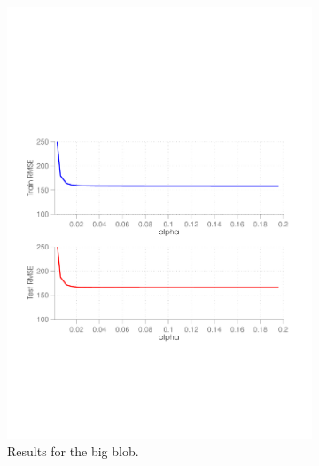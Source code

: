 \begin{figure}[ht]
  \centering
  \begin{subfigure}[b]{0.45\textwidth}
   \includegraphics[width=\textwidth]{figures/alpha_curve1.pdf}
    \caption{Results for the big blob.}
    \label{fig:alpha1}
  \end{subfigure}
  \begin{subfigure}[b]{0.45\textwidth}

\end{subfigure}
\end{figure}
